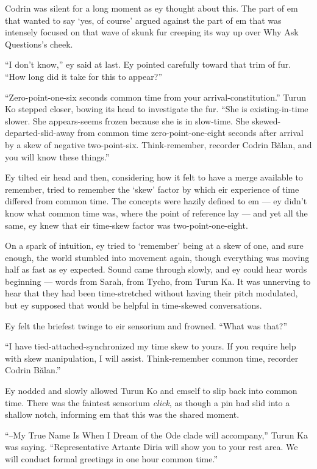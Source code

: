 Codrin was silent for a long moment as ey thought about this. The part of em that wanted to say `yes, of course' argued against the part of em that was intensely focused on that wave of skunk fur creeping its way up over Why Ask Questions's cheek.

``I don't know,'' ey said at last. Ey pointed carefully toward that trim of fur. ``How long did it take for this to appear?''

``Zero-point-one-six seconds common time from your arrival-constitution.'' Turun Ko stepped closer, bowing its head to investigate the fur. ``She is existing-in-time slower. She appears-seems frozen because she is in slow-time. She skewed-departed-slid-away from common time zero-point-one-eight seconds after arrival by a skew of negative two-point-six. Think-remember, recorder Codrin Bălan, and you will know these things.''

Ey tilted eir head and then, considering how it felt to have a merge available to remember, tried to remember the `skew' factor by which eir experience of time differed from common time. The concepts were hazily defined to em — ey didn't know what common time was, where the point of reference lay — and yet all the same, ey knew that eir time-skew factor was two-point-one-eight.

On a spark of intuition, ey tried to `remember' being at a skew of one, and sure enough, the world stumbled into movement again, though everything was moving half as fast as ey expected. Sound came through slowly, and ey could hear words beginning — words from Sarah, from Tycho, from Turun Ka. It was unnerving to hear that they had been time-stretched without having their pitch modulated, but ey supposed that would be helpful in time-skewed conversations.

Ey felt the briefest twinge to eir sensorium and frowned. ``What was that?''

``I have tied-attached-synchronized my time skew to yours. If you require help with skew manipulation, I will assist. Think-remember common time, recorder Codrin Bălan.''

Ey nodded and slowly allowed Turun Ko and emself to slip back into common time. There was the faintest sensorium \emph{click}, as though a pin had slid into a shallow notch, informing em that this was the shared moment.

``--My True Name Is When I Dream of the Ode clade will accompany,'' Turun Ka was saying. ``Representative Artante Diria will show you to your rest area. We will conduct formal greetings in one hour common time.''

